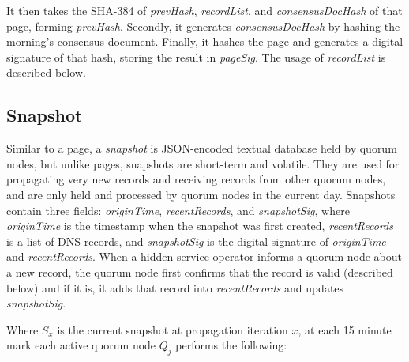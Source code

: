 It then takes the SHA-384 of \textit{prevHash}, \textit{recordList}, and \textit{consensusDocHash} of that page, forming \textit{prevHash}. Secondly, it generates \textit{consensusDocHash} by hashing the morning's consensus document. Finally, it hashes the page and generates a digital signature of that hash, storing the result in \textit{pageSig}. The usage of \textit{recordList} is described below.

\subsection{Snapshot}

Similar to a page, a \textit{snapshot} is JSON-encoded textual database held by quorum nodes, but unlike pages, snapshots are short-term and volatile. They are used for propagating very new records and receiving records from other quorum nodes, and are only held and processed by quorum nodes in the current day. Snapshots contain three fields: \textit{originTime}, \textit{recentRecords}, and \textit{snapshotSig}, where \textit{originTime} is the timestamp when the snapshot was first created, \textit{recentRecords} is a list of DNS records, and \textit{snapshotSig} is the digital signature of \textit{originTime} and \textit{recentRecords}. When a hidden service operator informs a quorum node about a new record, the quorum node first confirms that the record is valid (described below) and if it is, it adds that record into \textit{recentRecords} and updates \textit{snapshotSig}. 

Where $ S_{x} $ is the current snapshot at propagation iteration $ x $, at each 15 minute mark each active quorum node $ Q_{j} $ performs the following:


